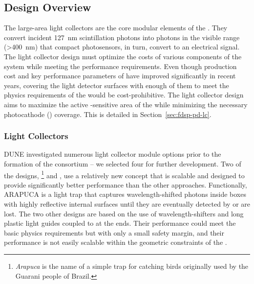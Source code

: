 \subsection{Design Overview}
\label{sec:pds:des-ov}

The  large-area light collectors are the core modular elements of the .  They convert incident \SI{127}{nm} scintillation photons into photons in the visible range (>\SI{400}{nm}) that compact   photosensors, in turn,  convert to an electrical signal. The light collector design must optimize the costs of various components of the system while meeting the performance requirements.  Even though production cost and key performance parameters of  have improved significantly in recent years, covering the light detector surfaces with enough of them to meet the physics requirements of the  would be cost-prohibitive. 
The light collector design aims to maximize the active -sensitive area of the  while minimizing the necessary photocathode () coverage. This is detailed in
Section~\ref{sec:fdsp-pd-lc}.

\subsubsection{Light Collectors} 
\label{sssec:photoncollectors}

DUNE investigated numerous  light collector module options prior to the formation of the \single {} consortium -- we selected four for further development. 
Two of the designs, \footnote{\textit{Arapuca} is the name of a simple trap for catching birds originally used by the Guarani people of Brazil.} %
and , %
use a relatively new concept that is scalable and designed to provide  
significantly better performance than the other approaches. Functionally, ARAPUCA is a light trap that captures wavelength-shifted photons inside boxes with highly reflective internal surfaces until they are eventually detected by  or are lost.  The two other designs are based on the use of wavelength-shifters and long plastic light guides coupled to  at the ends. Their performance could meet the basic physics requirements but with only a small safety margin, and their performance is not easily scalable within the geometric constraints of the . 

